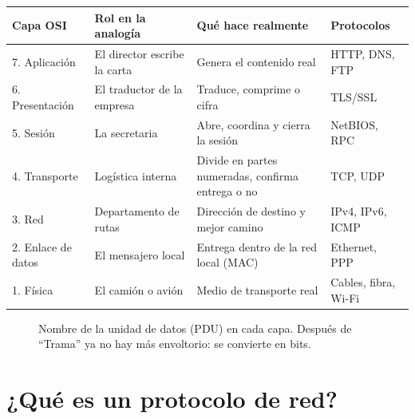 \documentclass[11pt,a4paper]{article}
\begin{document}
\begin{center}
\small
\begin{tabularx}{\textwidth}{@{}l l X l@{}}
\toprule
\textbf{Capa OSI} & \textbf{Rol en la analogía} & \textbf{Qué hace realmente} & \textbf{Protocolos} \\
\midrule
7. Aplicación & El director escribe la carta & Genera el contenido real & HTTP, DNS, FTP \\
6. Presentación & El traductor de la empresa & Traduce, comprime o cifra & TLS/SSL \\
5. Sesión & La secretaria & Abre, coordina y cierra la sesión & NetBIOS, RPC \\
4. Transporte & Logística interna & Divide en partes numeradas, confirma entrega o no & TCP, UDP \\
3. Red & Departamento de rutas & Dirección de destino y mejor camino & IPv4, IPv6, ICMP \\
2. Enlace de datos & El mensajero local & Entrega dentro de la red local (MAC) & Ethernet, PPP \\
1. Física & El camión o avión & Medio de transporte real & Cables, fibra, Wi-Fi \\
\bottomrule
\end{tabularx}
\end{center}

\begin{figure}[h]
\centering
{}
\caption{Nombre de la unidad de datos (PDU) en cada capa. Después de ``Trama'' ya no hay más envoltorio: se convierte en bits.}
\end{figure}

\newpage
\section{¿Qué es un protocolo de red?}
\end{document}
